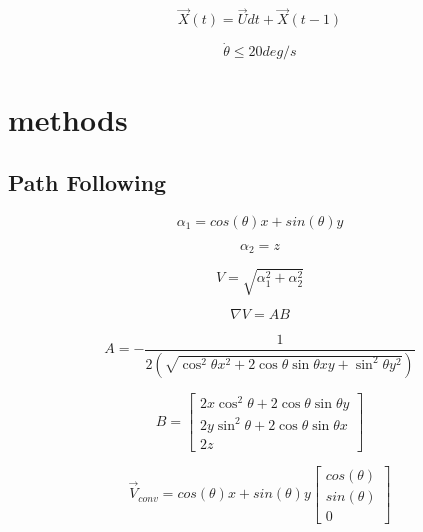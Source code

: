 \documentclass[conf]{new-aiaa}
\begin{document}
\begin{equation}
\label{uavPosition}
\overrightarrow{X}(t) = \overrightarrow{U}dt + \overrightarrow{X}(t-1)
\end{equation}


\begin{equation}
\label{turnRate}
\dot{\theta} \leq 20 deg/s
\end{equation}




\section{methods}
\subsection{Path Following}


\begin{equation}
\label{pathFunction}
\alpha_1 = cos(\theta)x + sin(\theta)y
\end{equation}

\begin{equation}
\label{pathFunctionZ}
\alpha_2 = z
\end{equation}




\begin{equation}
\label{potentialFunction}
V = \sqrt{\alpha_1^2+\alpha_2^2}
\end{equation}



\begin{equation}
\nabla V = AB
\label{gradPotential}
\end{equation}

\begin{equation}
A = -\frac{1}{2(\sqrt{\cos^2\theta x^2+2\cos\theta\sin\theta xy +\sin^2 \theta y^2})}
\label{gradPotentialA}
\end{equation}

\begin{equation}
B = \begin{bmatrix}
2x\cos^2\theta + 2\cos\theta\sin\theta y \\
2y\sin^2\theta + 2\cos\theta\sin\theta x \\
2z
\end{bmatrix}
\label{gradPotentialB}
\end{equation}





\begin{equation}
\label{zPlane}
\overrightarrow{V}_{conv} = cos(\theta)x + sin(\theta)y\begin{bmatrix}
cos(\theta) \\
sin(\theta) \\
0
\end{bmatrix}
\end{equation}
\end{document}
